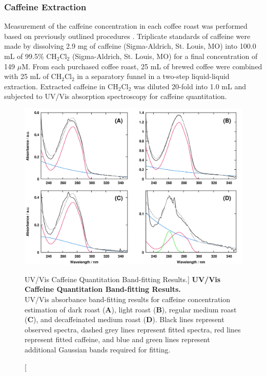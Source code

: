\subsubsection{Caffeine Extraction}

\begin{doublespace}
Measurement of the caffeine concentration in each coffee roast was performed
based on previously outlined procedures \cite{belay:food2008}. Triplicate
standards of caffeine were made by dissolving 2.9 mg of caffeine
(Sigma-Aldrich, St. Louis, MO) into 100.0 mL of 99.5\% CH$_2$Cl$_2$
(Sigma-Aldrich, St. Louis, MO) for a final concentration of 149 $\mu$M.
From each purchased coffee roast, 25 mL of brewed coffee were combined with
25 mL of CH$_2$Cl$_2$ in a separatory funnel in a two-step liquid-liquid
extraction. Extracted caffeine in CH$_2$Cl$_2$ was diluted 20-fold into 1.0
mL and subjected to UV/Vis absorption spectroscopy for caffeine quantitation.
\end{doublespace}

\begin{figure}[ht!]
\includegraphics[width=6in]{figs/apps/01-uvfit.png}
\caption
      [UV/Vis Caffeine Quantitation Band-fitting Results.]{
  {\bf UV/Vis Caffeine Quantitation Band-fitting Results.}
  \\
  UV/Vis absorbance band-fitting results for caffeine concentration estimation
  of dark roast ({\bf A}), light roast ({\bf B}), regular medium roast
  ({\bf C}), and decaffeinated medium roast ({\bf D}). Black lines represent
  observed spectra, dashed grey lines represent fitted spectra, red lines
  represent fitted caffeine, and blue and green lines represent additional
  Gaussian bands required for fitting.
}
\label{figure.4.1}
\end{figure}


